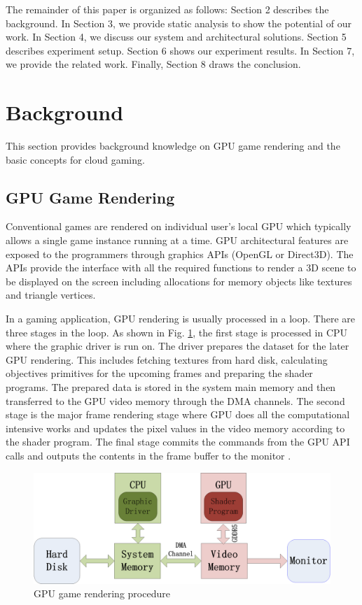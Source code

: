 \documentclass[pageno]{jpaper}
\begin{document}
The remainder of this paper is organized as follows: Section 2 describes the background. In Section 3, we provide static analysis to show the potential of our work. In Section 4, we discuss our system and architectural solutions. Section 5 describes experiment setup. Section 6 shows our experiment results. In Section 7, we provide the related work. Finally, Section 8 draws the conclusion.



\section{Background}

This section provides background knowledge on GPU game rendering and the basic concepts for cloud gaming.

\subsection {GPU Game Rendering}

Conventional games are rendered on individual user's local GPU which typically allows a single game instance running at a time. GPU architectural features are exposed to the programmers through graphics APIs (OpenGL or Direct3D). The APIs provide the
interface with all the required functions to render a 3D scene to be displayed on the screen
including allocations for memory objects like textures and triangle vertices.

In a gaming application, GPU rendering is usually processed
in a loop. There are three
stages in the loop. As shown in Fig. \ref{fig:gpu_render}, the first stage is processed in CPU where the graphic driver is run on.
The driver prepares the dataset for the later GPU rendering. This includes fetching textures from hard disk, calculating objectives
primitives for the upcoming frames and preparing the shader programs. The prepared data is stored in the system main memory and then transferred to the GPU video memory through the DMA channels.
The second stage is the major frame rendering stage where GPU does all the computational intensive works and updates the pixel values in the video memory according to the shader program. The final stage
commits the commands from the GPU API calls and outputs the contents in the frame buffer to
the monitor \cite{gallium} \cite{hlsl} \cite{gem} \cite{atidriver}.

 \begin{figure}
\centering
\includegraphics[width=3.4 in]{pics/gpu_render.png}
\caption{GPU game rendering procedure}
\label{fig:gpu_render}
\end{figure}
\end{document}
